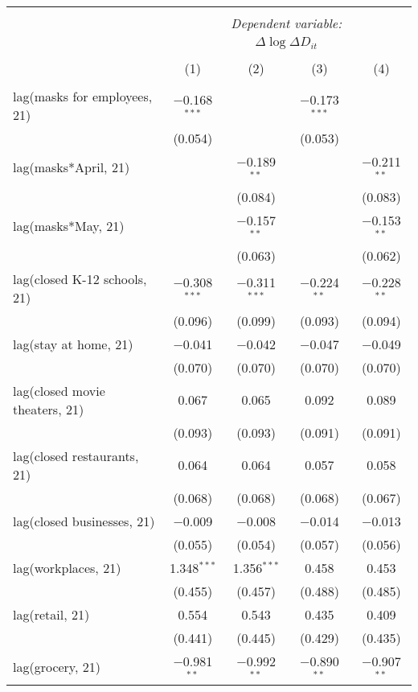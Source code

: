 \begin{tabular}{@{\extracolsep{1pt}}lcccc} 
\\[-1.8ex]\hline 
\hline \\[-1.8ex] 
 & \multicolumn{4}{c}{\textit{Dependent variable:}} \\ 
\cline{2-5} 
 & \multicolumn{4}{c}{$\Delta \log \Delta D_{it}$} \\ 
\\[-1.8ex] & (1) & (2) & (3) & (4)\\ 
\hline \\[-1.8ex] 
 lag(masks for employees, 21) & $-$0.168$^{***}$ &  & $-$0.173$^{***}$ &  \\ 
  & (0.054) &  & (0.053) &  \\ 
  lag(masks*April, 21) &  & $-$0.189$^{**}$ &  & $-$0.211$^{**}$ \\ 
  &  & (0.084) &  & (0.083) \\ 
  lag(masks*May, 21) &  & $-$0.157$^{**}$ &  & $-$0.153$^{**}$ \\ 
  &  & (0.063) &  & (0.062) \\ 
  lag(closed K-12 schools, 21) & $-$0.308$^{***}$ & $-$0.311$^{***}$ & $-$0.224$^{**}$ & $-$0.228$^{**}$ \\ 
  & (0.096) & (0.099) & (0.093) & (0.094) \\ 
  lag(stay at home, 21) & $-$0.041 & $-$0.042 & $-$0.047 & $-$0.049 \\ 
  & (0.070) & (0.070) & (0.070) & (0.070) \\ 
  lag(closed movie theaters, 21) & 0.067 & 0.065 & 0.092 & 0.089 \\ 
  & (0.093) & (0.093) & (0.091) & (0.091) \\ 
  lag(closed restaurants, 21) & 0.064 & 0.064 & 0.057 & 0.058 \\ 
  & (0.068) & (0.068) & (0.068) & (0.067) \\ 
  lag(closed businesses, 21) & $-$0.009 & $-$0.008 & $-$0.014 & $-$0.013 \\ 
  & (0.055) & (0.054) & (0.057) & (0.056) \\ 
  lag(workplaces, 21) & 1.348$^{***}$ & 1.356$^{***}$ & 0.458 & 0.453 \\ 
  & (0.455) & (0.457) & (0.488) & (0.485) \\ 
  lag(retail, 21) & 0.554 & 0.543 & 0.435 & 0.409 \\ 
  & (0.441) & (0.445) & (0.429) & (0.435) \\ 
  lag(grocery, 21) & $-$0.981$^{**}$ & $-$0.992$^{**}$ & $-$0.890$^{**}$ & $-$0.907$^{**}$ \\ 

\end{tabular}
